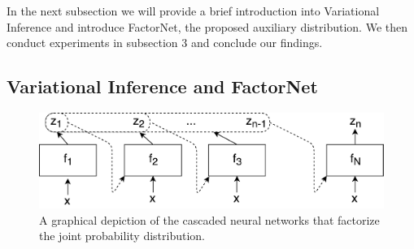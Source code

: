 In the next subsection we will provide a brief introduction into Variational Inference and introduce FactorNet, the proposed auxiliary distribution. We then conduct experiments in subsection 3 and conclude our findings.

\subsection{Variational Inference and FactorNet}

\begin{figure}
\centering
\includegraphics[width=0.9\linewidth]{factornet/factornet.pdf}
\caption[FactorNet: A graphical depiction of the cascaded neural networks that factorize the joint probability distribution.]{A graphical depiction of the cascaded neural networks that factorize the joint probability distribution.}
\label{fnet:neuralnets}
\end{figure}

